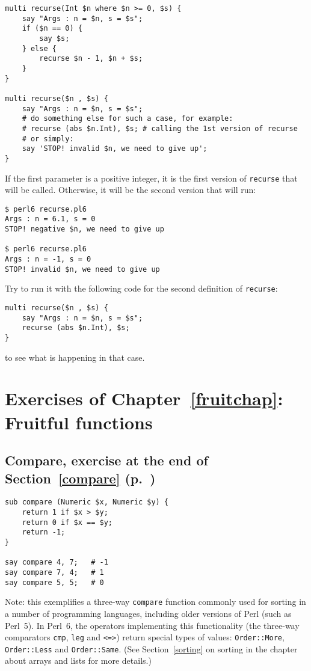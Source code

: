 \begin{verbatim}
multi recurse(Int $n where $n >= 0, $s) {
    say "Args : n = $n, s = $s";
    if ($n == 0) {
        say $s;
    } else {
        recurse $n - 1, $n + $s;
    }
}

multi recurse($n , $s) {
    say "Args : n = $n, s = $s";
    # do something else for such a case, for example:
    # recurse (abs $n.Int), $s; # calling the 1st version of recurse
    # or simply:
    say 'STOP! invalid $n, we need to give up';
}
\end{verbatim}

If the first parameter is a positive integer, it is the 
first version of {\tt recurse} that will be called. 
Otherwise, it will be the second version that will run:

\begin{verbatim}
$ perl6 recurse.pl6
Args : n = 6.1, s = 0
STOP! negative $n, we need to give up

$ perl6 recurse.pl6
Args : n = -1, s = 0
STOP! invalid $n, we need to give up
\end{verbatim}
%

Try to run it with the following code for the second 
definition of {\tt recurse}:

\begin{verbatim}
multi recurse($n , $s) {
    say "Args : n = $n, s = $s";
    recurse (abs $n.Int), $s;
}
\end{verbatim}
%
to see what is happening in that case.

\section{Exercises of Chapter~\ref{fruitchap}: Fruitful functions}

\subsection{Compare, exercise at the end of Section~\ref{compare} (p.~\pageref{compare})}
\label{sol_compare}

\begin{verbatim}
sub compare (Numeric $x, Numeric $y) {
    return 1 if $x > $y;
    return 0 if $x == $y;
    return -1;
}

say compare 4, 7;   # -1
say compare 7, 4;   # 1
say compare 5, 5;   # 0
\end{verbatim}

Note: this exemplifies a three-way {\tt compare} function 
commonly used for sorting in a number of programming 
languages, including older versions of Perl (such as 
Perl~5). In Perl~6, the operators implementing this 
functionality (the three-way comparators \verb'cmp', 
\verb'leg' and \verb'<=>') return special types of 
values: {\tt Order::More}, {\tt Order::Less} and 
{\tt Order::Same}. (See Section~\ref{sorting} 
on sorting in the chapter about arrays and lists for 
more details.)

